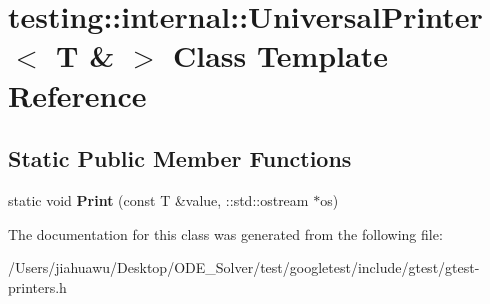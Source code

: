 \hypertarget{classtesting_1_1internal_1_1_universal_printer_3_01_t_01_6_01_4}{}\section{testing\+:\+:internal\+:\+:Universal\+Printer$<$ T \& $>$ Class Template Reference}
\label{classtesting_1_1internal_1_1_universal_printer_3_01_t_01_6_01_4}
\subsection*{Static Public Member Functions}
\begin{DoxyCompactItemize}
\item 
\mbox{\label{classtesting_1_1internal_1_1_universal_printer_3_01_t_01_6_01_4_a923a694be8aa66117848c1c5f57ede35}} 
static void {\bfseries Print} (const T \&value, \+::std\+::ostream $\ast$os)
\end{DoxyCompactItemize}


The documentation for this class was generated from the following file\+:\begin{DoxyCompactItemize}
\item 
/\+Users/jiahuawu/\+Desktop/\+O\+D\+E\+\_\+\+Solver/test/googletest/include/gtest/gtest-\/printers.\+h\end{DoxyCompactItemize}
